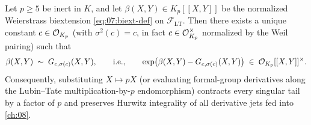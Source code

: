 
\begin{theorem}
\label{thm:07:biextension-rigidity}
Let $p \ge 5$ be inert in $K$, and let $\beta(X, Y) \in K_p[[X, Y]]$ be the normalized Weierstrass biextension \eqref{eq:07:biext-def} on $\mathcal{F}_{\mathrm{LT}}$. Then there exists a unique constant $c \in \mathcal{O}_{K_p}$ (with $\sigma^2(c) = c$, in fact $c \in \mathcal{O}_{K_p}^\times$ normalized by the Weil pairing) such that
\begin{equation}
\label{eq:07:beta-is-G}
  \beta(X, Y) \;\sim\; G_{c, \sigma(c)}(X, Y),
  \qquad\text{i.e.,}\qquad
  \exp\bigl(\beta(X, Y) - G_{c, \sigma(c)}(X, Y)\bigr) \;\in\; \mathcal{O}_{K_p}[[X, Y]]^\times.
\end{equation}
Consequently, substituting $X \mapsto p X$ (or evaluating formal-group derivatives along the Lubin--Tate multiplication-by-$p$ endomorphism) contracts every singular tail by a factor of $p$ and preserves Hurwitz integrality of all derivative jets fed into \cref{ch:08}.
\end{theorem}

